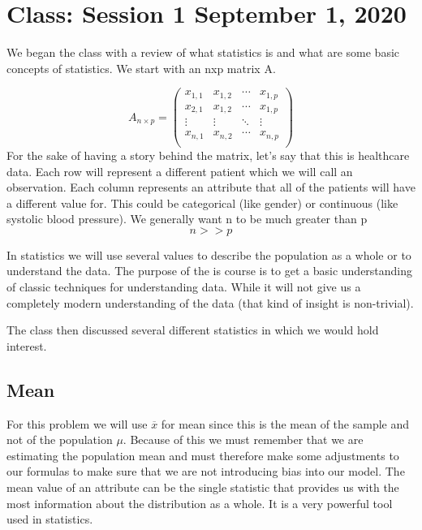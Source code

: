 \chapter{Class: Session 1 September 1, 2020}

\label{Review of Statistics}

We began the class with a review of what statistics is and what are some basic concepts of statistics. We start with an nxp matrix A.

\begin{equation*}
    A_{n \times p} =
    \begin{pmatrix}
    x_{1,1} & x_{1,2} & \cdots & x_{1,p} \\
    x_{2,1} & x_{1,2} & \cdots & x_{1,p} \\
    \vdots & \vdots & \ddots & \vdots \\
    x_{n,1} & x_{n,2} & \cdots & x_{n,p} \\
    \end{pmatrix}
\end{equation*}
For the sake of having a story behind the matrix, let's say that this is healthcare data. Each row will represent a different patient which we will call an observation. Each column represents an attribute that all of the patients will have a different value for. This could be categorical (like gender) or continuous (like systolic blood pressure).
We generally want n to be much greater than p
$$n>>p$$

In statistics we will use several values to describe the population as a whole or to understand the data. The purpose of the is course is to get a basic understanding of classic techniques for understanding data. While it will not give us a completely modern understanding of the data (that kind of insight is non-trivial).

The class then discussed several different statistics in which we would hold interest.

\section{Mean}

For this problem we will use $\overline{x}$ for mean since this is the mean of the sample and not of the population $\mu$. Because of this we must remember that we are estimating the population mean and must therefore make some adjustments to our formulas to make sure that we are not introducing bias into our model. The mean value of an attribute can be the single statistic that provides us with the most information about the distribution as a whole. It is a very powerful tool used in statistics.

